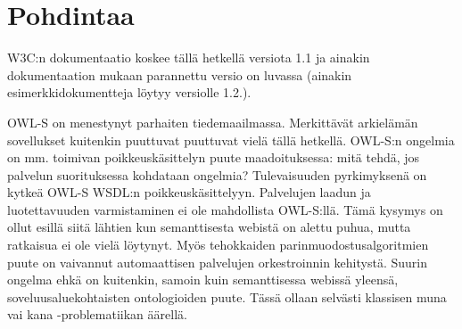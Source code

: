 \documentclass[finnish]{tktltiki2}
\theoremstyle{definition}
\theoremstyle{remark}
\begin{document}
\section{Pohdintaa}

W3C:n dokumentaatio koskee tällä hetkellä versiota 1.1 ja ainakin dokumentaation mukaan parannettu versio on luvassa (ainakin esimerkkidokumentteja löytyy versiolle 1.2.)\cite{OWLS}. 

OWL-S on menestynyt parhaiten tiedemaailmassa\cite{with_owls}. Merkittävät arkielämän sovellukset kuitenkin puuttuvat puuttuvat vielä tällä hetkellä. OWL-S:n ongelmia on mm. toimivan poikkeuskäsittelyn puute maadoituksessa\cite{with_owls}: mitä tehdä, jos palvelun suorituksessa kohdataan ongelmia? Tulevaisuuden pyrkimyksenä on kytkeä OWL-S WSDL:n poikkeuskäsittelyyn. Palvelujen laadun ja luotettavuuden varmistaminen ei ole mahdollista OWL-S:llä\cite{with_owls}. Tämä kysymys on ollut esillä siitä lähtien kun semanttisesta webistä on alettu puhua, mutta ratkaisua ei ole vielä löytynyt\cite{semweb}. Myös tehokkaiden parinmuodostusalgoritmien puute on vaivannut automaattisen palvelujen orkestroinnin kehitystä\cite{with_owls}. Suurin ongelma ehkä on kuitenkin, samoin kuin semanttisessa webissä yleensä, soveluusaluekohtaisten ontologioiden puute\cite{with_owls}. Tässä ollaan selvästi klassisen muna vai kana -problematiikan äärellä.    

%
%
% 
%



\end{document}
